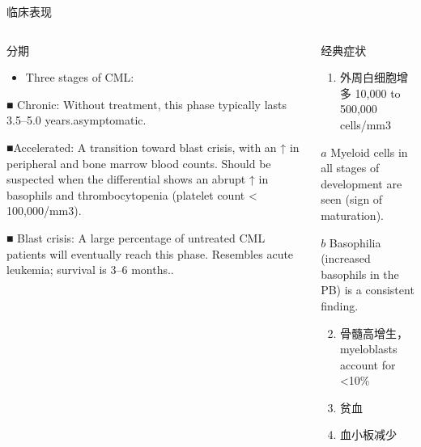 \documentclass[
  ignorenonframetext,
]{beamer}
\providecommand{\tightlist}{%
  \setlength{\itemsep}{0pt}\setlength{\parskip}{0pt}}
\begin{document}
\begin{frame}
\begin{block}{临床表现}
\protect\hypertarget{ux4e34ux5e8aux8868ux73b0-1}{}
\end{block}

\begin{columns}[T]
\begin{column}{0.3\textwidth}
\begin{block}{分期}
\protect\hypertarget{ux5206ux671f}{}
\begin{itemize}
\tightlist
\item
  Three stages of CML:
\end{itemize}

■ Chronic: Without treatment, this phase typically lasts 3.5--5.0
years.asymptomatic.

■Accelerated: A transition toward blast crisis, with an ↑ in peripheral
and bone marrow blood counts. Should be suspected when the differential
shows an abrupt ↑ in basophils and thrombocytopenia (platelet count
\textless{} 100,000/mm3).

■ Blast crisis: A large percentage of untreated CML patients will
eventually reach this phase. Resembles acute leukemia; survival is 3--6
months..
\end{block}
\end{column}

\begin{column}{0.3\textwidth}
\begin{block}{经典症状}
\protect\hypertarget{ux7ecfux5178ux75c7ux72b6}{}
\begin{enumerate}
\tightlist
\item
  外周白细胞增多 10,000 to 500,000 cells/mm3
\end{enumerate}

\(a\) Myeloid cells in all stages of development are seen (sign of
maturation).

\(b\) Basophilia (increased basophils in the PB) is a consistent
finding.

\begin{enumerate}
\setcounter{enumi}{1}
\item
  骨髓高增生，myeloblasts account for \textless10\%
\item
  贫血
\item
  血小板减少
\end{enumerate}
\end{block}
\end{column}


\end{columns}
\end{frame}
\end{document}
